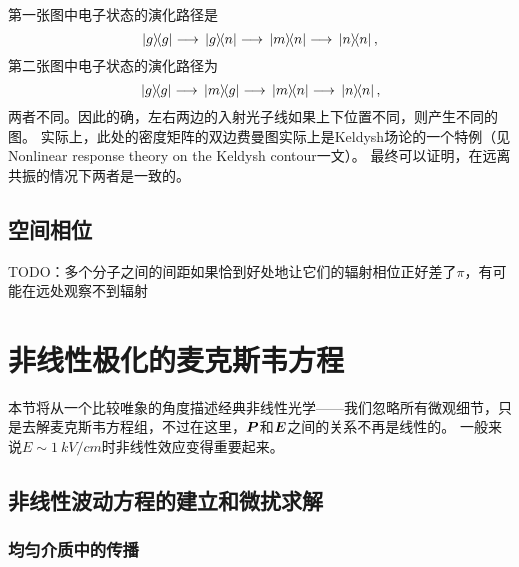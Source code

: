 第一张图中电子状态的演化路径是
\[
    \dyad{g} \longrightarrow \dyad*{g}{n} \longrightarrow \dyad*{m}{n} \longrightarrow \dyad*{n}{n},
\]
第二张图中电子状态的演化路径为
\[
    \dyad*{g} \longrightarrow \dyad*{m}{g} \longrightarrow \dyad*{m}{n} \longrightarrow \dyad*{n}{n},
\]
两者不同。因此的确，左右两边的入射光子线如果上下位置不同，则产生不同的图。
实际上，此处的密度矩阵的双边费曼图实际上是Keldysh场论的一个特例（见Nonlinear response theory on the Keldysh contour一文）。
最终可以证明，在远离共振的情况下两者是一致的。

\subsection{空间相位}

TODO：多个分子之间的间距如果恰到好处地让它们的辐射相位正好差了$\pi$，有可能在远处观察不到辐射

\section{非线性极化的麦克斯韦方程}\label{sec:non-linear-maxwell}

本节将从一个比较唯象的角度描述经典非线性光学——我们忽略所有微观细节，只是去解麦克斯韦方程组，不过在这里，$\vb*{P}$和$\vb*{E}$之间的关系不再是线性的。
一般来说$E \sim \SI{1}{kV/cm}$时非线性效应变得重要起来。

\subsection{非线性波动方程的建立和微扰求解}

\subsubsection{均匀介质中的传播}

